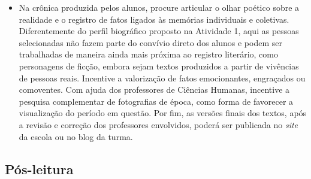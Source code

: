 \documentclass[11pt]{extarticle}
\begin{document}
\begin{itemize}
\item
  Na crônica produzida pelos alunos, procure articular o olhar poético
  sobre a realidade e o registro de fatos ligados às memórias
  individuais e coletivas. Diferentemente do perfil biográfico proposto
  na Atividade 1, aqui as pessoas selecionadas não fazem parte do
  convívio direto dos alunos e podem ser trabalhadas de maneira ainda
  mais próxima ao registro literário, como personagens de ficção, embora
  sejam textos produzidos a partir de vivências de pessoas reais.
  Incentive a valorização de fatos emocionantes, engraçados ou
  comoventes. Com ajuda dos professores de Ciências Humanas, incentive a
  pesquisa complementar de fotografias de época, como forma de favorecer
  a visualização do período em questão. Por fim, as versões finais dos
  textos, após a revisão e correção dos professores envolvidos, poderá
  ser publicada no \emph{site} da escola ou no blog da turma.
\end{itemize}

\subsection{Pós-leitura}

\end{document}
